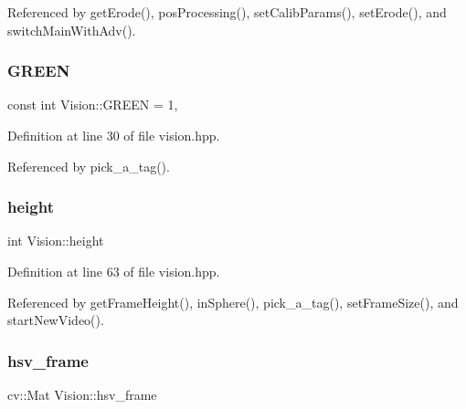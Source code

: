 Referenced by get\+Erode(), pos\+Processing(), set\+Calib\+Params(), set\+Erode(), and switch\+Main\+With\+Adv().

\mbox{\label{class_vision_aa6daf48b10c075b01c40c4de1240e17f}} 
\subsubsection{\texorpdfstring{G\+R\+E\+EN}{GREEN}}
{\footnotesize\ttfamily const int Vision\+::\+G\+R\+E\+EN = 1\hspace{0.3cm}{\ttfamily [static]}, {\ttfamily [private]}}



Definition at line 30 of file vision.\+hpp.



Referenced by pick\+\_\+a\+\_\+tag().

\mbox{\label{class_vision_aa6f52191ab439505b6156835594f1861}} 
\subsubsection{\texorpdfstring{height}{height}}
{\footnotesize\ttfamily int Vision\+::height\hspace{0.3cm}{\ttfamily [private]}}



Definition at line 63 of file vision.\+hpp.



Referenced by get\+Frame\+Height(), in\+Sphere(), pick\+\_\+a\+\_\+tag(), set\+Frame\+Size(), and start\+New\+Video().

\mbox{\label{class_vision_a1bbcad0a1286863da12d3580492b4a8d}} 
\subsubsection{\texorpdfstring{hsv\+\_\+frame}{hsv\_frame}}
{\footnotesize\ttfamily cv\+::\+Mat Vision\+::hsv\+\_\+frame\hspace{0.3cm}{\ttfamily [private]}}



